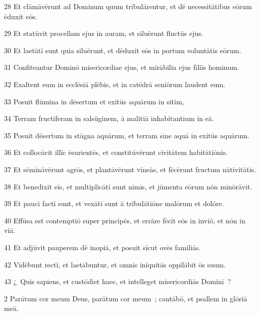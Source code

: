 \psalmVerse
  {\phantom{0}28}
  {Et clāmāvērunt ad Dominum quum trībulārentur, et dē necessitātibus eōrum ēduxit eōs.}


\psalmVerse
  {\phantom{0}29}
  {Et statūvit procellam ejus in auram, et siluērunt fluctūs ejus.}


\psalmVerse
  {\phantom{0}30}
  {Et laetātī sunt quia siluērunt, et dēduxit eōs in portum voluntātis eōrum.}


\psalmVerse
  {\phantom{0}31}
  {Confiteantur Dominō misericordiae ejus, et mīrābilia ejus fīliīs hominum.}


\psalmVerse
  {\phantom{0}32}
  {Exaltent eum in ecclēsiā plēbis, et in catēdrā seniōrum laudent eum.}


\psalmVerse
  {\phantom{0}33}
  {Posuit flūmina in dēsertum et exitūs aquārum in sitim,}


\psalmVerse
  {\phantom{0}34}
  {Terram fructiferam in salsūginem, ā malitiā inhabitantium in eā.}


\psalmVerse
  {\phantom{0}35}
  {Posuit dēsertum in stāgna aquārum, et terram sine aquā in exitūs aquārum.}


\psalmVerse
  {\phantom{0}36}
  {Et collocāvit illīc ēsurientēs, et constitūvērunt cīvitātem habitātiōnis.}


\psalmVerse
  {\phantom{0}37}
  {Et sēmināvērunt agrōs, et plantāvērunt vīneās, et fēcērunt fructum nātīvitātis.}


\psalmVerse
  {\phantom{0}38}
  {Et benedixit eīs, et multiplicātī sunt nimis, et jūmenta eōrum nōn minōrāvit.}


\psalmVerse
  {\phantom{0}39}
  {Et paucī factī sunt, et vexātī sunt ā trībulātiōne malōrum et dolōre.}


\psalmVerse
  {\phantom{0}40}
  {Effūsa est contemptiō super principēs, et errāre fēcit eōs in inviō, et nōn in viā.}


\psalmVerse
  {\phantom{0}41}
  {Et adjūvit pauperem dē inopiā, et posuit sīcut ovēs familiās.}


\psalmVerse
  {\phantom{0}42}
  {Vidēbunt rectī, et laetābuntur, et omnis inīquitās oppīlābit ōs suum.}


\psalmVerse
  {\phantom{0}43}
  {¿~Quis sapiens, et custōdiet haec, et intelleget misericordiās Dominī~?}




\psalmVerse
  {\phantom{00}2}
  {Parātum cor meum Deus, parātum cor meum~; cantābō, et psallem in glōriā meā.}


